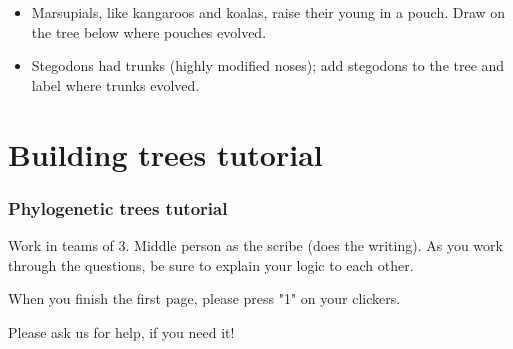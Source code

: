 \begin{noheadline}
\begin{frame}
    \begin{adjustwidth}{-1.5em}{-1.5em}
        \begin{itemize}
            \item Marsupials, like kangaroos and koalas, raise their young in a
                pouch.  Draw on the tree below where pouches evolved.

            \item Stegodons had trunks (highly modified noses); add stegodons
                to the tree and label where trunks evolved.
        \end{itemize}

    \begin{center}
        
    \end{center}

    \end{adjustwidth}
\end{frame}
\end{noheadline}

\section{Building trees tutorial}

\begin{frame}
    \frametitle{Phylogenetic trees tutorial}

    \vspace{1cm}
    Work in teams of 3. Middle person as the scribe (does the writing). As you
    work through the questions, be sure to explain your logic to each other.

    \vspace{1cm}
    When you finish the first page, please press "1" on your clickers.

    \vspace{1cm}
    Please ask us for help, if you need it!
\end{frame}


